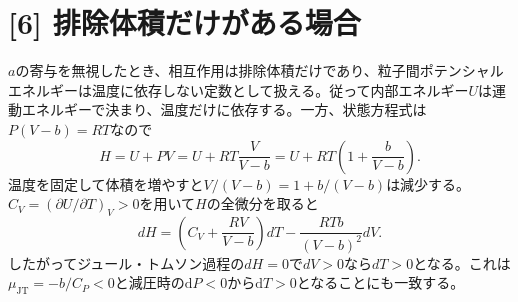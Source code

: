 \documentclass[11pt,a4paper]{article}
\begin{document}
\section*{[6] 排除体積だけがある場合}
$a$の寄与を無視したとき、相互作用は排除体積だけであり、粒子間ポテンシャルエネルギーは温度に依存しない定数として扱える。従って内部エネルギー$U$は運動エネルギーで決まり、温度だけに依存する。一方、状態方程式は$P(V-b)=RT$なので
\begin{equation}
  H=U+PV=U+RT\frac{V}{V-b}
   =U+RT\left(1+\frac{b}{V-b}\right).
\end{equation}
温度を固定して体積を増やすと$V/(V-b)=1+b/(V-b)$は減少する。$C_V=(\partial U/\partial T)_V>0$を用いて$H$の全微分を取ると
\begin{equation}
 dH=\left(C_V+\frac{RV}{V-b}\right)dT-\frac{RTb}{(V-b)^2}dV.
\end{equation}
したがってジュール・トムソン過程の$dH=0$で$dV>0$なら$dT>0$となる。これは$\mu_{\mathrm{JT}}=-b/C_P<0$と減圧時の$\mathrm dP<0$から$\mathrm dT>0$となることにも一致する。
\end{document}
